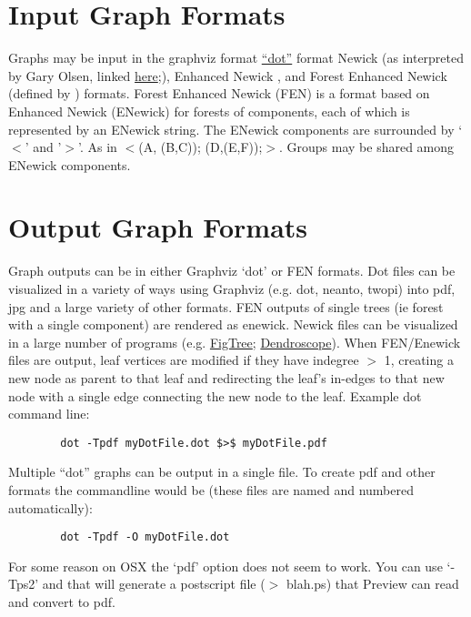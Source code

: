 \documentclass[11pt]{book}
\begin{document}
	\section{Input Graph Formats}
	Graphs may be input in the graphviz format \href{https://graphviz.org/}{``dot''} format Newick (as interpreted by Gary Olsen, linked \href{https://evolution.genetics.washington.edu/phylip/newick_doc.html}{here};), Enhanced Newick \cite{Cardonaetal2008},
	and Forest Enhanced Newick (defined by \citealp{WheelerPhyloSuperGraphs}) formats.
	Forest Enhanced Newick (FEN) is a format based on Enhanced Newick (ENewick) for 
	forests of components, each of which is represented by an ENewick string.  The ENewick 
	components are surrounded by `$<$' and '$>$'. As in $<$(A, (B,C)); (D,(E,F));$>$.  
	Groups may be shared among ENewick components.
	
	
	\section{Output Graph Formats}
	Graph outputs can be in either Graphviz `dot' or FEN formats.  Dot files can be visualized in a variety of ways 
	using Graphviz (e.g. dot, neanto, twopi) into pdf, jpg and a large variety of other formats. FEN outputs of 
	single trees (ie forest with a single component) are rendered as enewick.  Newick files can be visualized in a 
	large number of programs (e.g. \href{http://tree.bio.ed.ac.uk/software/figtree/}{FigTree}; \href{http:/https://uni-tuebingen.de/fakultaeten/mathematisch-naturwissenschaftliche-fakultaet/fachbereiche/informatik/lehrstuehle/algorithms-in-bioinformatics/software/}{Dendroscope}). 	
	When FEN/Enewick files are output, leaf vertices are modified if they have indegree $>$ 1, creating a new node as parent to that leaf
	and redirecting the leaf's in-edges to that new node with a single edge connecting the new node to the leaf.  Example dot command line: 
	\begin{verbatim}
		dot -Tpdf myDotFile.dot $>$ myDotFile.pdf
	\end{verbatim}
	
	Multiple ``dot'' graphs can be output in a single file.  To create pdf and other formats the
	commandline would be (these files are named and numbered automatically):
	\begin{verbatim}
		dot -Tpdf -O myDotFile.dot
	\end{verbatim}
	
	For some reason on OSX the `pdf' option does not seem to work.  You can use `-Tps2' and that will generate a postscript file ($>$ blah.ps) that Preview can read and convert to pdf.
	
\end{document}
